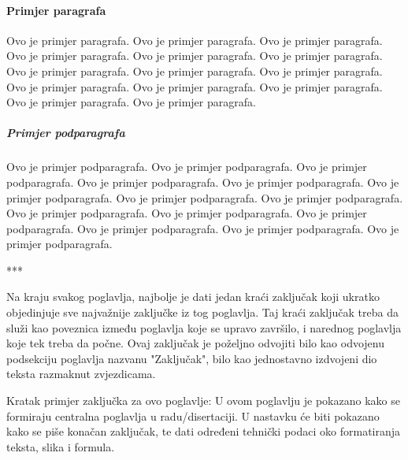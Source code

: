 \paragraph{Primjer paragrafa}
Ovo je primjer paragrafa. Ovo je primjer paragrafa. Ovo je primjer paragrafa. Ovo je primjer paragrafa. Ovo je primjer paragrafa. Ovo je primjer paragrafa. Ovo je primjer paragrafa. Ovo je primjer paragrafa. Ovo je primjer paragrafa. Ovo je primjer paragrafa. Ovo je primjer paragrafa. Ovo je primjer paragrafa. Ovo je primjer paragrafa. Ovo je primjer paragrafa.
\subparagraph{Primjer podparagrafa}
Ovo je primjer podparagrafa. Ovo je primjer podparagrafa. Ovo je primjer podparagrafa. Ovo je primjer podparagrafa. Ovo je primjer podparagrafa. Ovo je primjer podparagrafa. Ovo je primjer podparagrafa. Ovo je primjer podparagrafa. Ovo je primjer podparagrafa. Ovo je primjer podparagrafa. Ovo je primjer podparagrafa. Ovo je primjer podparagrafa. Ovo je primjer podparagrafa. Ovo je primjer podparagrafa.

\begin{center}
\vspace{0.5cm}
*\hspace{2cm}*\hspace{2cm}*
\vspace{0.3cm}
\end{center}

Na kraju svakog poglavlja, najbolje je dati jedan kraći zaključak koji ukratko objedinjuje sve najvažnije zaključke iz tog poglavlja. Taj kraći zaključak treba da služi kao poveznica između poglavlja koje se upravo završilo, i narednog poglavlja koje tek treba da počne. Ovaj zaključak je poželjno odvojiti bilo kao odvojenu podsekciju poglavlja nazvanu "Zaključak", bilo kao jednostavno izdvojeni dio teksta razmaknut zvjezdicama.

Kratak primjer zaključka za ovo poglavlje: U ovom poglavlju je pokazano kako se formiraju centralna poglavlja u radu/disertaciji. U nastavku će biti pokazano kako se piše konačan zaključak, te dati određeni tehnički podaci oko formatiranja teksta, slika i formula.

